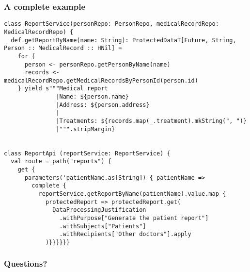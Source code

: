\documentclass[aspectratio=169]{beamer}
\begin{document}
\begin{frame}[fragile]
\frametitle{A complete example}

\begin{lstlisting}[style=myScalastyle,frame=none]
class ReportService(personRepo: PersonRepo, medicalRecordRepo: MedicalRecordRepo) {
  def getReportByName(name: String): ProtectedDataT[Future, String, Person :: MedicalRecord :: HNil] =
    for {
      person <- personRepo.getPersonByName(name)
      records <- medicalRecordRepo.getMedicalRecordsByPersonId(person.id)
    } yield s"""Medical report
               |Name: ${person.name}
               |Address: ${person.address}
               |
               |Treatments: ${records.map(_.treatment).mkString(", ")}
               |""".stripMargin}


class ReportApi (reportService: ReportService) {
  val route = path("reports") {
    get {
      parameters('patientName.as[String]) { patientName =>
        complete {
          reportService.getReportByName(patientName).value.map {
            protectedReport => protectedReport.get(
              DataProcessingJustification
                .withPurpose["Generate the patient report"]
                .withSubjects["Patients"]
                .withRecipients["Other doctors"].apply
            )}}}}}}

\end{lstlisting}

\end{frame}

\begin{frame}
\frametitle{Questions?}


\end{frame}
\end{document}
